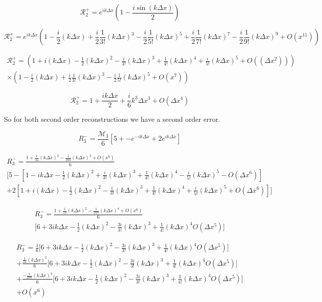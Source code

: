 \documentclass[12pt]{article}
\begin{document}
\[\mathcal{R}_2^+ = e^{ik\Delta x}\left(1  - \frac{i\sin\left(k\Delta x\right)}{2} \right)\]

\[\mathcal{R}_2^+ = e^{ik\Delta x}\left(1  - \frac{i}{2} (k \Delta x) + \frac{i}{2}\frac{1}{3!} (k \Delta x)^3 - \frac{i}{2}\frac{1}{5!} (k \Delta x)^5 + \frac{i}{2}\frac{1}{7!} (k \Delta x)^7 - \frac{i}{2}\frac{1}{9!} (k \Delta x)^{9} + O(x^{11}) \right)\]

\begin{multline}
\mathcal{R}_2^+ = \left(1 + i (k\Delta x)  - \frac{1}{2} (k\Delta x)^2 - \frac{i}{3!} (k\Delta x)^3 + \frac{1}{4!} (k\Delta x)^4 + \frac{i}{5!} (k\Delta x)^5 + O(\left(\Delta x^2\right))\right) \\ \times\left(1  - \frac{i}{2} (k \Delta x) + \frac{i}{2}\frac{1}{3!} (k \Delta x)^3 - \frac{i}{2}\frac{1}{5!} (k \Delta x)^5 + O(x^{7}) \right)
\end{multline}

\[\mathcal{R}_2^+ =1 + \frac{ik\Delta x}{2} + \frac{i}{6} k^3 \Delta x^3 + O\left(\Delta x ^4\right)\]

So for both second order reconstructions we have a second order error.

\[R_3^-= \frac{\mathcal{M}_3}{6}\left[5 +  - e^{-ik\Delta x} + 2e^{ik\Delta x} \right]\]

\begin{multline}
R_3^-= \frac{1 + \frac{1}{24} (k\Delta x)^2 - \frac{1}{288} (k\Delta x)^4 + O(x^{6})}{6} \\ \Bigg[5  - \left[1 - i k\Delta x  - \frac{1}{2} (k\Delta x)^2 + \frac{i}{3!} (k\Delta x)^3 + \frac{1}{4!} (k\Delta x)^4 - \frac{i}{5!} (k\Delta x)^5 - O( \Delta x^6)\right] \\ + 2 \left[1 + i (k\Delta x)  - \frac{1}{2} (k\Delta x) ^2 - \frac{i}{3!} (k\Delta x) ^3 + \frac{1}{4!} (k\Delta x) ^4 + \frac{i}{5!} (k\Delta x) ^5 + O(\Delta x ^6)\right] \Bigg] 
\end{multline}

\begin{multline}
R_3^-= \frac{1 + \frac{1}{24} (k\Delta x)^2 - \frac{1}{288} (k\Delta x)^4 + O(x^{6})}{6} \\ \Bigg[6 + 3i k\Delta x - \frac{1}{2} (k\Delta x)^2 -\frac{3i}{3!} (k\Delta x)^3 +  \frac{1}{4!} (k\Delta x)^4   O( \Delta x^5) \Bigg] 
\end{multline}

\begin{multline}
R_3^-= \frac{1}{6}\Bigg[6 + 3i k\Delta x - \frac{1}{2} (k\Delta x)^2 -\frac{3i}{3!} (k\Delta x)^3 +  \frac{1}{4!} (k\Delta x)^4   O( \Delta x^5) \Bigg] \\ + \frac{\frac{1}{24} (k \Delta x)^2}{6} \Bigg[6 + 3i k\Delta x - \frac{1}{2} (k\Delta x)^2 -\frac{3i}{3!} (k\Delta x)^3 +  \frac{1}{4!} (k\Delta x)^4   O( \Delta x^5) \Bigg]  \\+ \frac{- \frac{1}{288} (k\Delta x)^4}{6} \Bigg[6 + 3i k\Delta x - \frac{1}{2} (k\Delta x)^2 -\frac{3i}{3!} (k\Delta x)^3 +  \frac{1}{4!} (k\Delta x)^4   O( \Delta x^5) \Bigg] \\  + O(x^{6})
\end{multline}
\end{document}
